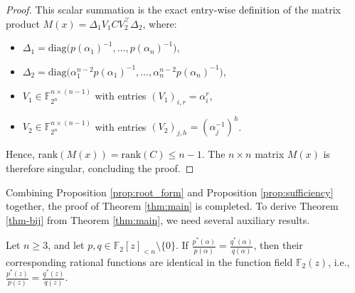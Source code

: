 \documentclass[hidelinks,onefignum,onetabnum]{siamart251216}
\theoremstyle{definition}
\theoremstyle{remark}
\begin{document}
\begin{proof}
	This scalar summation is the exact entry-wise definition of the matrix product $M(x) = \Delta_1 V_1 C V_2^{\top} \Delta_2$, where:
	\begin{itemize}
		\item $\Delta_1 = \mathrm{diag}\big(p(\alpha_1)^{-1}, \dots, p(\alpha_n)^{-1}\big)$,
		\item $\Delta_2 = \mathrm{diag}\big(\alpha_1^{n-2}p(\alpha_1)^{-1}, \dots, \alpha_n^{n-2}p(\alpha_n)^{-1}\big)$,
		\item $V_1 \in \mathbb{F}_{2^n}^{n \times (n-1)}$ with entries $(V_1)_{i,r} = \alpha_i^r$,
		\item $V_2 \in \mathbb{F}_{2^n}^{n \times (n-1)}$ with entries $(V_2)_{j,h} = (\alpha_j^{-1})^h$.
	\end{itemize}
	
	Hence, $\mathrm{rank}(M(x)) = \mathrm{rank}(C) \le n-1$. The $n \times n$ matrix $M(x)$ is therefore singular, concluding the proof.
\end{proof}

Combining Proposition \ref{prop:root_form} and Proposition \ref{prop:sufficiency} together, the proof of Theorem \ref{thm:main} is completed. To derive Theorem \ref{thm-bij} from Theorem \ref{thm:main}, we need several auxiliary results.

\begin{lemma}\label{lem:distinct_roots}
	Let $n \ge 3$, and let $p, q \in \mathbb{F}_2[z]_{<n} \setminus \{0\}$. If $\frac{p^*(\alpha)}{p(\alpha)} = \frac{q^*(\alpha)}{q(\alpha)}$, then their corresponding rational functions are identical in the function field $\mathbb{F}_2(z)$, i.e., $\frac{p^*(z)}{p(z)} = \frac{q^*(z)}{q(z)}$.
\end{lemma}
\end{document}
